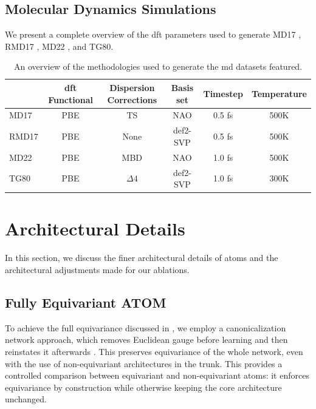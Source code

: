 \subsection{Molecular Dynamics Simulations}
We present a complete overview of the \gls{dft} parameters used to generate MD17 \cite{chmiela_machine_2017}, RMD17 \cite{christensen_role_2020}, MD22 \cite{chmiela_accurate_2023}, and TG80.
\begin{table}[H]
    \centering
    \caption{An overview of the methodologies used to generate the \gls{md} datasets featured.}
    \label{tab:dft_techniques}
    \begin{tabular}{lccccc}
        \toprule
        & \gls{dft} Functional & Dispersion Corrections & Basis set & Timestep & Temperature \\
        \midrule
        MD17 & PBE & TS & NAO & 0.5 fs & 500K  \\
        RMD17 & PBE & None & def2-SVP & 0.5 fs & 500K  \\
        MD22 & PBE & MBD & NAO & 1.0 fs & 500K \\
        TG80 & PBE & \(\Delta 4\) & def2-SVP & 1.0 fs & 300K \\
        \bottomrule
    \end{tabular}
\end{table}

\newpage
\section{Architectural Details}
In this section, we discuss the finer architectural details of \gls{atoms} and the architectural adjustments made for our ablations.
\subsection{Fully Equivariant ATOM}
\label{sec:fully_equivariant}
To achieve the full equivariance discussed in , we employ a canonicalization network approach, which removes Euclidean gauge before learning and then reinstates it afterwards \cite{kaba_equivariance_2023}. This preserves equivariance of the whole network, even with the use of non-equivariant architectures in the trunk. This provides a controlled comparison between equivariant and non-equivariant \gls{atoms}: it enforces equivariance by construction while otherwise keeping the core architecture unchanged.

